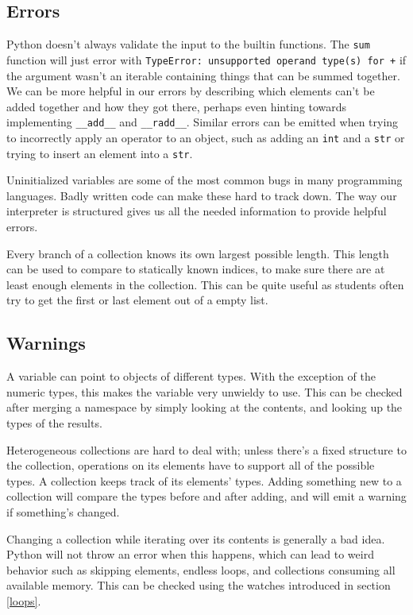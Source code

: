 \documentclass[a4paper, 16pt, oneside]{Thesis}
\begin{document}
\subsection{Errors}\label{errors}

Python doesn't always validate the input to the builtin functions. The
\texttt{sum} function will just error with
\texttt{TypeError:\ unsupported\ operand\ type(s)\ for\ +} if the
argument wasn't an iterable containing things that can be summed
together. We can be more helpful in our errors by describing which
elements can't be added together and how they got there, perhaps even
hinting towards implementing \texttt{\_\_add\_\_} and
\texttt{\_\_radd\_\_}. Similar errors can be emitted when trying to
incorrectly apply an operator to an object, such as adding an
\texttt{int} and a \texttt{str} or trying to insert an element into a
\texttt{str}.

Uninitialized variables are some of the most common bugs in many
programming languages. Badly written code can make these hard to track
down. The way our interpreter is structured gives us all the needed
information to provide helpful errors.

Every branch of a collection knows its own largest possible length. This
length can be used to compare to statically known indices, to make sure
there are at least enough elements in the collection. This can be quite
useful as students often try to get the first or last element out of a
empty list.

\subsection{Warnings}\label{warnings}

A variable can point to objects of different types. With the exception
of the numeric types, this makes the variable very unwieldy to use. This
can be checked after merging a namespace by simply looking at the
contents, and looking up the types of the results.

Heterogeneous collections are hard to deal with; unless there's a fixed
structure to the collection, operations on its elements have to support
all of the possible types. A collection keeps track of its elements'
types. Adding something new to a collection will compare the types
before and after adding, and will emit a warning if something's changed.

Changing a collection while iterating over its contents is generally a
bad idea. Python will not throw an error when this happens, which can
lead to weird behavior such as skipping elements, endless loops, and
collections consuming all available memory. This can be checked using
the watches introduced in section \ref{loops}.
\end{document}
